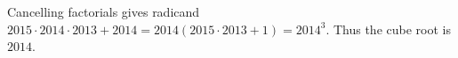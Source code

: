 Cancelling factorials gives radicand $ 2015\cdot2014\cdot2013+2014=2014(2015\cdot2013+1)=2014^3 $. Thus the cube root is $\boxed{2014}$.
